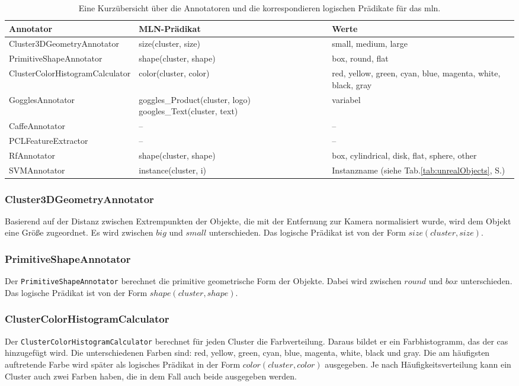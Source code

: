 \begin{table}
\begin{tabularx}{\textwidth}{lXX}
\textbf{Annotator}				& \textbf{MLN-Prädikat}	& \textbf{Werte}	\\ \hline 
Cluster3DGeometryAnnotator		& size(cluster, size)	& small, medium, large	\\ 
PrimitiveShapeAnnotator			& shape(cluster, shape)	& box, round, flat 	\\ 
ClusterColorHistogramCalculator  & color(cluster, color)	& red, yellow, green, cyan, blue, magenta, white, black, gray \\ 
GogglesAnnotator				& goggles\_Product(cluster, logo) \newline googles\_Text(cluster, text) 	& 	variabel	\\ 
CaffeAnnotator					& --					& --	\\
PCLFeatureExtractor				& --					& --	\\ 
RfAnnotator						& shape(cluster, shape)	&	box, cylindrical, disk, flat, sphere, other	\\
SVMAnnotator					& instance(cluster, i)	& Instanzname (siehe Tab.\ref{tab:unrealObjects}, S.\pageref{tab:unrealObjects}) 	\\ \hline 
\end{tabularx}
\caption[Kurzübersicht der Annotatoren]{Eine Kurzübersicht über die Annotatoren und die korrespondieren logischen Prädikate für das \gls{mln}.}
\label{tab:annotators}
\end{table}

\subsubsection{Cluster3DGeometryAnnotator}
Basierend auf der Distanz zwischen Extrempunkten der Objekte, die mit der Entfernung zur Kamera normalisiert wurde, wird dem Objekt eine Größe zugeordnet. Es wird zwischen $big$ und $small$ unterschieden. Das logische Prädikat ist von der Form $size(cluster,  size)$. 

\subsubsection{PrimitiveShapeAnnotator} 
Der \texttt{PrimitiveShapeAnnotator} berechnet die primitive geometrische Form der Objekte.  Dabei wird zwischen $round$ und $box$ unterschieden. Das logische Prädikat ist von der Form $shape(cluster,  shape)$.
   
\subsubsection{ClusterColorHistogramCalculator}
Der \texttt{ClusterColorHistogramCalculator} berechnet für jeden Cluster die Farbverteilung. Daraus bildet er ein Farbhistogramm, das der \gls{cas} hinzugefügt wird. Die unterschiedenen Farben sind: red, yellow, green, cyan, blue, magenta, white, black und gray. Die am häufigsten auftretende Farbe wird später als logisches Prädikat in der Form $color(cluster,  color)$ ausgegeben. Je nach Häufigkeitsverteilung kann ein Cluster auch zwei Farben haben, die in dem Fall auch beide ausgegeben werden. 

